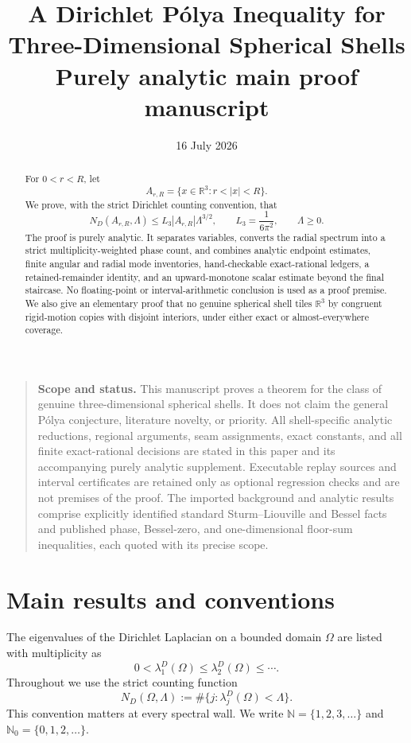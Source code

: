 \documentclass[11pt]{article}
\title{A Dirichlet P\'olya Inequality for\\Three-Dimensional Spherical Shells\\[0.4em]
\large Purely analytic main proof manuscript}
\author{}
\date{16 July 2026}
\numberwithin{equation}{section}
\theoremstyle{definition}
\theoremstyle{remark}
\newcommand{\R}{\mathbb R}
\newcommand{\N}{\mathbb N}
\newcommand{\Nzero}{\mathbb N_0}
\begin{document}
\maketitle
\thispagestyle{titlepage}

\begin{quote}
\small
\textbf{Scope and status.}
This manuscript proves a theorem for the class of genuine three-dimensional
spherical shells.  It does not claim the general P\'olya conjecture,
literature novelty, or priority.  All shell-specific analytic reductions,
regional arguments, seam assignments, exact constants, and all finite
exact-rational decisions are stated in this paper and its accompanying
purely analytic supplement.  Executable replay sources and interval
certificates are retained only as optional regression checks and are not
premises of the proof.  The imported background and analytic results
comprise explicitly identified standard Sturm--Liouville and Bessel facts and
published phase, Bessel-zero, and one-dimensional floor-sum inequalities,
each quoted with its precise scope.
\end{quote}

\begin{abstract}
For \(0<r<R\), let
\[
  A_{r,R}=\{x\in\R^3:r<|x|<R\}.
\]
We prove, with the strict Dirichlet counting convention, that
\[
  N_D(A_{r,R},\Lambda)
  \le L_3|A_{r,R}|\Lambda^{3/2},
  \qquad
  L_3=\frac1{6\pi^2},
  \qquad \Lambda\ge0.
\]
The proof is purely analytic.  It separates variables, converts the radial
spectrum into a strict multiplicity-weighted phase count, and combines
analytic endpoint estimates, finite angular and radial mode inventories,
hand-checkable exact-rational ledgers, a retained-remainder identity, and an
upward-monotone scalar estimate beyond the final staircase.  No floating-point
or interval-arithmetic conclusion is used as a proof
premise.  We also give an elementary proof that no genuine spherical
shell tiles \(\R^3\) by congruent rigid-motion copies with disjoint interiors,
under either exact or almost-everywhere coverage.
\end{abstract}

\tableofcontents
\clearpage

\section{Main results and conventions}

The eigenvalues of the Dirichlet Laplacian on a bounded domain \(\Omega\) are
listed with multiplicity as
\[
  0<\lambda_1^D(\Omega)\le\lambda_2^D(\Omega)\le\cdots.
\]
Throughout we use the strict counting function
\begin{equation}
  N_D(\Omega,\Lambda)
  :=\#\{j:\lambda_j^D(\Omega)<\Lambda\}.
  \label{eq:strict-count}
\end{equation}
This convention matters at every spectral wall.  We write
\(\N=\{1,2,3,\ldots\}\) and \(\Nzero=\{0,1,2,\ldots\}\).
\end{document}
